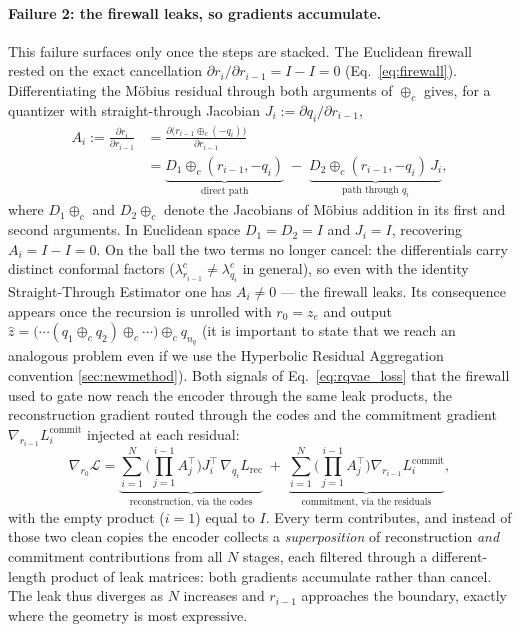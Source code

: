 \documentclass[12pt]{report}
\begin{document}
\paragraph{Failure 2: the firewall leaks, so gradients accumulate.}
This failure surfaces only once the steps are stacked. The Euclidean firewall rested on the exact cancellation $\partial r_i/\partial r_{i-1}=I-I=0$ (Eq.~\ref{eq:firewall}). Differentiating the M\"obius residual through both arguments of $\oplus_c$ gives, for a quantizer with straight-through Jacobian $J_i := \partial q_i/\partial r_{i-1}$,
\begin{equation}
    \label{eq:leak}
    \begin{aligned}
    A_i := \frac{\partial r_i}{\partial r_{i-1}}
    &= \frac{\partial\big(r_{i-1}\oplus_c(-q_i)\big)}{\partial r_{i-1}} \\
    &= \underbrace{D_1\!\oplus_c(r_{i-1}, -q_i)}_{\text{direct path}}
    \;-\; \underbrace{D_2\!\oplus_c(r_{i-1}, -q_i)\, J_i}_{\text{path through }q_i},
    \end{aligned}
\end{equation}
where $D_1\!\oplus_c$ and $D_2\!\oplus_c$ denote the Jacobians of M\"obius addition in its first and second arguments. In Euclidean space $D_1=D_2=I$ and $J_i=I$, recovering $A_i=I-I=0$. On the ball the two terms no longer cancel: the differentials carry distinct conformal factors ($\lambda^c_{r_{i-1}}\neq\lambda^c_{q_i}$ in general), so even with the identity Straight-Through Estimator one has $A_i\neq 0$ --- the firewall leaks. Its consequence appears once the recursion is unrolled with $r_0=z_e$ and output $\hat z = \big(\cdots(q_1\oplus_c q_2)\oplus_c\cdots\big)\oplus_c q_{n_q}$ (it is important to state that we reach an analogous problem even if we use the Hyperbolic Residual Aggregation convention \ref{sec:newmethod}). Both signals of Eq.~\ref{eq:rqvae_loss} that the firewall used to gate now reach the encoder through the same leak products, the reconstruction gradient routed through the codes and the commitment gradient $\nabla_{r_{i-1}} L^{\text{commit}}_i$ injected at each residual:
\begin{equation}
    \label{eq:stack}
    \nabla_{r_0}\mathcal{L}
    = \underbrace{\sum_{i=1}^{N}\Big(\textstyle\prod_{j=1}^{i-1} A_j^{\top}\Big)
    J_i^{\top}\,\nabla_{q_i} L_{\text{rec}}}_{\text{reconstruction, via the codes}}
    \;+\; \underbrace{\sum_{i=1}^{N}\Big(\textstyle\prod_{j=1}^{i-1} A_j^{\top}\Big)
    \nabla_{r_{i-1}} L^{\text{commit}}_i}_{\text{commitment, via the residuals}},
\end{equation}
with the empty product ($i=1$) equal to $I$. Every term contributes, and instead of those two clean copies the encoder collects a \emph{superposition} of reconstruction \emph{and} commitment contributions from all $N$ stages, each filtered through a different-length product of leak matrices: both gradients accumulate rather than cancel. The leak thus diverges as $N$ increases and $r_{i-1}$ approaches the boundary, exactly where the geometry is most expressive.
\end{document}
